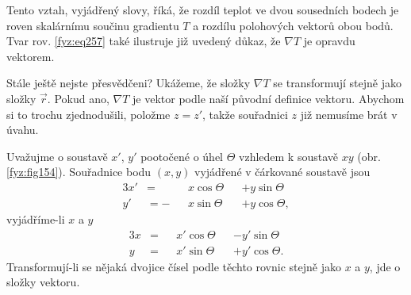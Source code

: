     Tento vztah, vyjádřený slovy, říká, že rozdíl teplot ve dvou sousedních bodech je roven 
    skalárnímu součinu gradientu $T$ a rozdílu polohových vektorů obou bodů. Tvar rov. 
    \ref{fyz:eq257} také ilustruje již uvedený důkaz, že  $\nabla T$ je opravdu vektorem.

    Stále ještě nejste přesvědčeni? Ukážeme, že složky $\nabla T$ se transformují stejně jako 
    složky $\vec{r}$. Pokud ano, $\nabla T$ je vektor podle naší původní definice vektoru. Abychom 
    si to trochu zjednodušili, položme $z=z'$, takže souřadnici $z$ již nemusíme brát v úvahu.

    Uvažujme o soustavě $x'$, $y'$ pootočené o úhel $\Theta$  vzhledem k soustavě $xy$ (obr.
    \ref{fyz:fig154}). Souřadnice bodu $(x,y)$ vyjádřené v čárkované soustavě jsou
    \begin{alignat*}{3}
      x' &=  &&x\cos\Theta &&+ y\sin\Theta             \\
      y' &= -&&x\sin\Theta &&+ y\cos\Theta,            
    \end{alignat*}
    vyjádříme-li $x$ a $y$
    \begin{alignat}{3}
      x  &= &&x'\cos\Theta &&- y'\sin\Theta    \label{fyz:eq253}\\
      y  &= &&x'\sin\Theta &&+ y'\cos\Theta.  \nonumber
    \end{alignat}
    Transformují-li se nějaká dvojice čísel podle těchto rovnic stejně jako $x$ a $y$, jde o složky
    vektoru.

